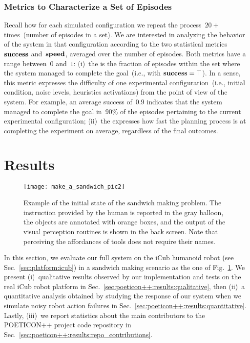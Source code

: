 \subsubsection{Metrics to Characterize a Set of Episodes}
Recall how for each simulated configuration we repeat the process~$20+$ times~(number of episodes in a set).
We are interested in analyzing the behavior of the system in that configuration according to the two statistical metrics~$\textbf{\ensuremath{\text{success}}}$ and~$\textbf{\ensuremath{\text{speed}}}$, averaged over the number of episodes.
Both metrics have a range between~$0$ and~$1$:
(i)~the \varAvgSuccess{} is the fraction of episodes within the set where the system managed to complete the goal~(i.e., with $\textbf{\ensuremath{\text{success}}}=\top$). In a sense, this metric expresses the difficulty of one experimental configuration~(i.e., initial condition, noise levels, heuristics activations) from the point of view of the system. For example, an average success of~$0.9$ indicates that the system managed to complete the goal in~$90\%$ of the episodes pertaining to the current experimental configuration;
(ii)~the \varAvgSpeed{} expresses how fast the planning process is at completing the experiment on average, regardless of the final outcomes.

\section{Results}
\label{sec:poeticon++:results}

\begin{figure}
\centering
\texttt{[image: make\_a\_sandwich\_pic2]}
\caption[Example of the initial state of the sandwich making problem.]{Example of the initial state of the sandwich making problem.
The instruction provided by the human is reported in the gray balloon, the objects are annotated with orange boxes, and the output of the visual perception routines is shown in the back screen.
Note that perceiving the affordances of tools does not require their names.}
\label{fig:make_a_sandwich}
\end{figure}

In this section, we evaluate our full system on the iCub humanoid robot (see Sec.~\ref{sec:platform:icub}) in a sandwich making scenario as the one of Fig.~\ref{fig:make_a_sandwich}.
We present
(i)~qualitative results observed by our implementation and tests on the real iCub robot platform in Sec.~\ref{sec:poeticon++:results:qualitative}, then
(ii)~a quantitative analysis obtained by studying the response of our system when we simulate noisy robot action failures in Sec.~\ref{sec:poeticon++:results:quantitative}.
Lastly, (iii)~we report statistics about the main contributors to the POETICON++ project code repository in Sec.~\ref{sec:poeticon++:results:repo_contributions}.

